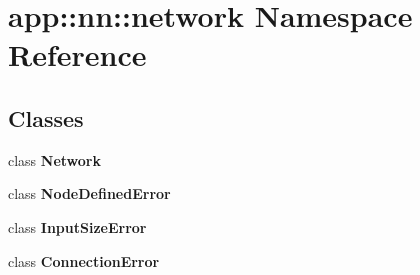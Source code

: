 \section{app::nn::network Namespace Reference}
\label{namespaceapp_1_1nn_1_1network}


\subsection*{Classes}
\begin{CompactItemize}
\item 
class {\bf Network}
\item 
class {\bf NodeDefinedError}
\item 
class {\bf InputSizeError}
\item 
class {\bf ConnectionError}
\end{CompactItemize}
